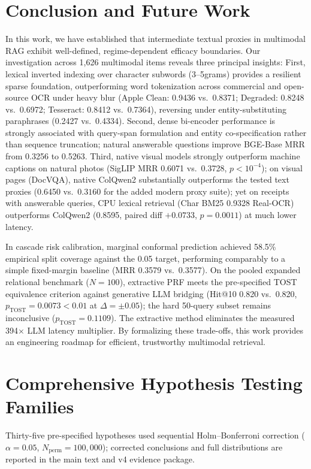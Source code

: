 \section{Conclusion and Future Work}
\label{sec:conclusion}

In this work, we have established that intermediate textual proxies in multimodal RAG exhibit well-defined, regime-dependent efficacy boundaries. Our investigation across 1,626 multimodal items reveals three principal insights: First, lexical inverted indexing over character subwords (3--5grams) provides a resilient sparse foundation, outperforming word tokenization across commercial and open-source OCR under heavy blur (Apple Clean: 0.9436 vs.\ 0.8371; Degraded: 0.8248 vs.\ 0.6972; Tesseract: 0.8412 vs.\ 0.7364), reversing under entity-substituting paraphrases (0.2427 vs.\ 0.4334). Second, dense bi-encoder performance is strongly associated with query-span formulation and entity co-specification rather than sequence truncation; natural answerable questions improve BGE-Base MRR from 0.3256 to 0.5263. Third, native visual models strongly outperform machine captions on natural photos (SigLIP MRR 0.6071 vs.\ 0.3728, $p < 10^{-4}$); on visual pages (DocVQA), native ColQwen2 substantially outperforms the tested text proxies (0.6450 vs.\ $0.3160$ for the added modern proxy suite); yet on receipts with answerable queries, CPU lexical retrieval (Char BM25 0.9328 Real-OCR) outperforms ColQwen2 (0.8595, paired diff $+0.0733$, $p=0.0011$) at much lower latency.

In cascade risk calibration, marginal conformal prediction achieved 58.5\% empirical split coverage against the 0.05 target, performing comparably to a simple fixed-margin baseline (MRR 0.3579 vs.\ 0.3577). On the pooled expanded relational benchmark ($N=100$), extractive PRF meets the pre-specified TOST equivalence criterion against generative LLM bridging (Hit@10 0.820 vs.\ 0.820, $p_{\text{TOST}}=0.0073 < 0.01$ at $\Delta=\pm 0.05$); the hard 50-query subset remains inconclusive ($p_{\text{TOST}}=0.1109$). The extractive method eliminates the measured 394$\times$ LLM latency multiplier. By formalizing these trade-offs, this work provides an engineering roadmap for efficient, trustworthy multimodal retrieval.

\appendices
\section{Comprehensive Hypothesis Testing Families}
\label{sec:appendix_holm}
Thirty-five pre-specified hypotheses used sequential Holm--Bonferroni correction ($\alpha=0.05$, $N_{\mathrm{perm}}=100{,}000$); corrected conclusions and full distributions are reported in the main text and v4 evidence package.


